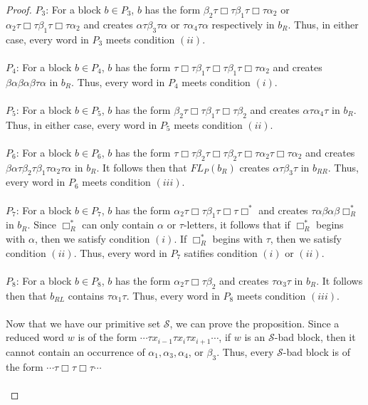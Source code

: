 \documentclass[11pt]{amsart}
\theoremstyle{definition}
\theoremstyle{remark}
\numberwithin{equation}{section}
\begin{document}
\begin{proof}
\underline{$P_{3}$}: For a block $b \in P_{3}$, $b$ has the form  $ \beta_{2} \tau \Box \tau \beta_{1} \tau \Box \tau \alpha_{2}$ or $ \alpha_{2} \tau \Box \tau \beta_{1} \tau \Box \tau \alpha_{2}$ and creates $\alpha \tau \beta_{3} \tau \alpha$ or $\tau \alpha_{4} \tau \alpha$ respectively in $b_{R}$. Thus, in either case, every word in $P_{3}$ meets condition $(ii)$. \\ \\
\underline{$P_{4}$}: For a block $b \in P_{4}$, $b$ has the form  $\tau \Box \tau \beta_{1} \tau \Box \tau \beta_{1} \tau \Box \tau \alpha_{2}$ and creates $\beta \alpha \beta \alpha \beta \tau \alpha$ in $b_{R}$. Thus, every word in $P_{4}$ meets condition $(i)$. \\ \\
\underline{$P_{5}$}: For a block $b \in P_{5}$, $b$ has the form  $\beta_{2} \tau \Box \tau \beta_{1} \tau \Box \tau \beta_{2}$ and creates $\alpha \tau \alpha_{4} \tau$ in $b_{R}$. Thus, in either case, every word in $P_{5}$ meets condition $(ii)$. \\ \\
\underline{$P_{6}$}: For a block $b \in P_{6}$, $b$ has the form $\tau \Box \tau \beta_{2} \tau \Box \tau \beta_{2} \tau \Box \tau \alpha_{2} \tau \Box \tau \alpha_{2}$ and creates $\beta \alpha \tau \beta_{2} \tau \beta_{1} \tau \alpha_{2} \tau \alpha$ in $b_{R}$. It follows then that $FL_{P}(b_{R})$ creates $\alpha \tau \beta_{3} \tau$ in $b_{RR}$. Thus, every word in $P_{6}$ meets condition $(iii)$.  \\ \\
\underline{$P_{7}$}: For a block $b \in P_{7}$, $b$ has the form  $\alpha_{2} \tau \Box \tau \beta_{1} \tau \Box \tau \Box^{*}$ and creates $\tau \alpha \beta \alpha \beta \Box^{*}_{R}$ in $b_{R}$. Since $\Box^{*}_{R}$ can only contain $\alpha$ or $\tau$-letters, it follows that if $\Box^{*}_{R}$ begins with $\alpha$, then we satisfy condition $(i)$. If $\Box^{*}_{R}$ begins with $\tau$, then we satisfy condition $(ii)$. Thus, every word in $P_{7}$ satifies condition $(i)$ or $(ii)$. \\ \\
\underline{$P_{8}$}: For a block $b \in P_{8}$, $b$ has the form  $\alpha_{2} \tau \Box \tau \beta_{2}$ and creates $\tau \alpha_{3} \tau$ in $b_{R}$. It follows then that $b_{RL}$ contains $\tau \alpha_{1} \tau$. Thus, every word in $P_{8}$ meets condition $(iii)$. \\ \\ 
Now that we have our primitive set $\mathcal{S}$, we can prove the proposition. Since a reduced word $w$ is of the form $\cdots \tau x_{i-1} \tau x_{i} \tau x_{i+1} \cdots$, if $w$ is an $\mathcal{S}$-bad block, then it cannot contain an occurrence of $\alpha_{1}, \alpha_{3}, \alpha_{4}$, or $\beta_{3}$. Thus, every $\mathcal{S}$-bad block is of the form $\cdots \tau \Box \tau \Box \tau \cdots$ \\ \\

\end{proof}
\end{document}
